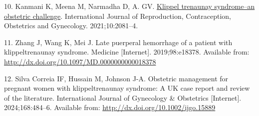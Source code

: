 \documentclass[
  letterpaper,
  DIV=11,
  numbers=noendperiod]{scrartcl}
\newlength{\cslhangindent}
\newenvironment{CSLReferences}[2] %
 {\begin{list}{}{%
  \setlength{\itemindent}{0pt}
  \setlength{\leftmargin}{0pt}
  \setlength{\parsep}{0pt}
  \ifodd #1
   \setlength{\leftmargin}{\cslhangindent}
   \setlength{\itemindent}{-1\cslhangindent}
  \fi
  \setlength{\itemsep}{#2\baselineskip}}}
 {\end{list}}
\begin{document}
\begin{CSLReferences}{0}{1}
10. Kanmani K, Meena M, Narmadha D, A. GV.
\href{https://doi.org/10.18203/2320-1770.ijrcog20211511}{Klippel
trenaunay syndrome--an obstetric challenge}. International Journal of
Reproduction, Contraception, Obstetrics and Gynecology. 2021;10:2081--4.

11. Zhang J, Wang K, Mei J. Late puerperal hemorrhage of a patient with
klippel{\textendash}trenaunay syndrome. Medicine {[}Internet{]}.
2019;98:e18378. Available from:
\url{http://dx.doi.org/10.1097/MD.0000000000018378}

12. Silva Correia IF, Hussain M, Johnson J-A. Obstetric management for
pregnant women with klippel{\textendash}trenaunay syndrome: A UK case
report and review of the literature. International Journal of Gynecology
\& Obstetrics {[}Internet{]}. 2024;168:484--6. Available from:
\url{http://dx.doi.org/10.1002/ijgo.15889}

\end{CSLReferences}
\end{document}
